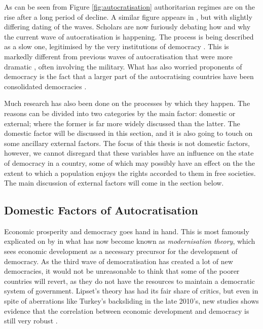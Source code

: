 As can be seen from Figure \ref{fig:autocratisation} authoritarian regimes are on the rise after a long period of decline. A similar figure appears in \citet{luhrmann_third_2019}, but with slightly differing dating of the waves. Scholars are now furiously debating how and why the current wave of autocratisation is happening.  The process is being described as a slow one, legitimised by the very institutions of democracy \citep{varol_stealth_2015, bermeo_democratic_2016, luhrmann_third_2019}. This is markedly different from previous waves of autocratisation that were more dramatic \citep[pp. 6-8]{bermeo_democratic_2016}, often involving the military. What has also worried proponents of democracy is the fact that a larger part of the autocratising countries have been consolidated democracies \citep{luhrmann_third_2019}. 

Much research has also been done on the processes by which they happen. The reasons can be divided into two categories by the main factor: domestic or external; where the former is far more widely discussed than the latter. The domestic factor will be discussed in this section, and it is also going to touch on some ancillary external factors. The focus of this thesis is not domestic factors, however, we cannot disregard that these variables have an influence on the state of democracy in a country, some of which may possibly have an effect on the the extent to which a population enjoys the rights accorded to them in free societies. The main discussion of external factors will come in the section below.

\subsection{Domestic Factors of Autocratisation}
Economic prosperity and democracy goes hand in hand. This is most famously explicated on by \citet{lipset_social_1959} in what has now become known as \textit{modernisation theory}, which sees economic development as a necessary precursor for the development of democracy. As the third wave of democratisation has created a lot of new democracies, it would not be unreasonable to think that some of the poorer countries will revert, as they do not have the resources to maintain a democratic system of government. Lipset's theory has had its fair share of critics, but even in spite of aberrations like Turkey's backsliding in the late 2010's, new studies shows evidence that the correlation between economic development and democracy is still very robust \citep{brownlee_limited_2017}.


